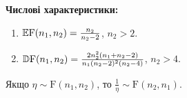 \noindent\textbf{Числові характеристики:}
\begin{enumerate}
    \item $\mathbb{E}\mathrm{F}(n_1, n_2) = \frac{n_2}{n_2 - 2}$, $n_2 > 2$.
    \item $\mathbb{D}\mathrm{F}(n_1, n_2) = \frac{2 n_2^2 (n_1 + n_2 - 2)}{n_1 (n_2 - 2)^2 (n_2 -4)}$, $n_2>4$.
\end{enumerate}

\begin{remark}
    Якщо $\eta \sim \mathrm{F}(n_1, n_2)$, то $\frac{1}{\eta} \sim \mathrm{F}(n_2, n_1)$.
\end{remark}